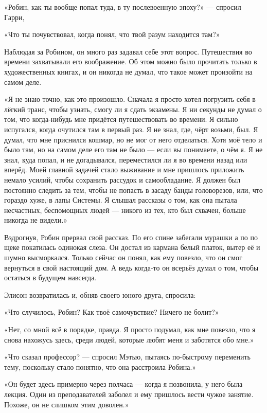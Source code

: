 \documentclass[a5paper, 9pt,
final, openany, twoside=true]{memoir}
\begin{document}
«Робин, как ты вообще попал туда, в ту послевоенную эпоху?» — спросил Гарри,

«Что ты почувствовал, когда понял, что твой разум находится там?»

Наблюдая за Робином, он много раз задавал себе этот вопрос. Путешествия во времени захватывали его воображение. Об этом можно было прочитать только в художественных книгах, и он никогда не думал, что такое может произойти на самом деле.

«Я не знаю точно, как это произошло. Сначала я просто хотел погрузить себя в лёгкий транс, чтобы узнать, смогу ли я сдать экзамены. Я ни секунды не думал о том, что когда-нибудь мне придётся путешествовать во времени. Я сильно испугался, когда очутился там в первый раз. Я не знал, где, чёрт возьми, был. Я думал, что мне приснился кошмар, но не мог от него отделаться. Хотя моё тело и было там, но на самом деле его там не было — если вы понимаете, о чём я. Я не знал, куда попал, и не догадывался, переместился ли я во времени назад или вперёд. Моей главной задачей стало выживание и мне пришлось приложить немало усилий, чтобы сохранить рассудок и самообладание. Я должен был постоянно следить за тем, чтобы не попасть в засаду банды головорезов, или, что гораздо хуже, в лапы Системы. Я слышал рассказы о том, как она пытала несчастных, беспомощных людей — никого из тех, кто был схвачен, больше никогда не видели.»

Вздрогнув, Робин прервал свой рассказ. По его спине забегали мурашки а по по щеке покатилась одинокая слеза. Он достал из кармана белый платок, вытер её и шумно высморкался. Только сейчас он понял, как ему повезло, что он смог вернуться в свой настоящий дом. А ведь когда-то он всерьёз думал о том, чтобы остаться в будущем навсегда.\bigskip

Элисон возвратилась и, обняв своего юного друга, спросила:

«Что случилось, Робин? Как твоё самочувствие? Ничего не болит?»

«Нет, со мной всё в порядке, правда. Я просто подумал, как мне повезло, что я снова нахожусь здесь, среди людей, которые любят меня и заботятся обо мне.»

«Что сказал профессор? — спросил Мэтью, пытаясь по-быстрому переменить тему, поскольку стало понятно, что она расстроила Робина.»

«Он будет здесь примерно через полчаса — когда я позвонила, у него была лекция. Один из преподавателей заболел и ему пришлось вести чужое занятие. Похоже, он не слишком этим доволен.»
\end{document}
